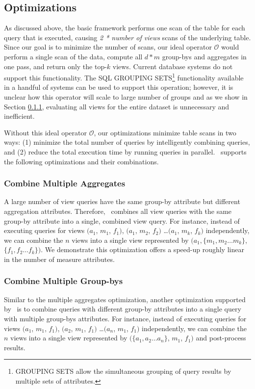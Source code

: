 \subsection{Optimizations} 
\label{sec:optimizations}
As discussed above, the basic framework performs one scan of the table for each
query that is executed, causing {\it 2 * number of views} scans of the
underlying table. Since our goal is to minimize the number of scans, our ideal
operator $\mathcal{O}$ would perform a single scan of the data, compute all
$d*m$ group-bys and aggregates in one pass, and return only the top-$k$
views.
Current database systems do not support this functionality. 
The SQL GROUPING SETS\footnote{GROUPING SETS allow the simultaneous
  grouping of query results by multiple sets of attributes.} functionality
  available in a handful of systems can be used to support this operation;
  however, it is unclear how this operator will scale to large number of groups
  and as we show in Section \ref{}, evaluating all views for the entire dataset
  is unnecessary and inefficient.

Without this ideal operator $\mathcal{O}$,
our optimizations minimize table scans in two ways: (1) minimize the total number of
queries by intelligently combining queries, and (2) reduce the total
execution time by running queries in parallel. \SeeDB\ supports the following
optimizations and their combinations.

\subsubsection {Combine Multiple Aggregates} 
A large number of view queries have the same group-by attribute but different
aggregation attributes. 
Therefore, \SeeDB\ combines all view queries with the same
group-by attribute into a single, combined view query. For instance, instead of executing
queries for views $(a_1$, $m_1$, $f_1)$, $(a_1$, $m_2$, $f_2)$ \ldots $(a_1$, $m_k$, $f_k)$
independently, we can combine the $n$ views into a single view represented by
$(a_1, \{m_1, m_2\ldots m_k\}$, $\{f_1, f_2\ldots f_k\})$. We demonstrate this
optimization offers a speed-up roughly linear in the number of measure
attributes.

\subsubsection {Combine Multiple Group-bys}
\label{subsec:mult_gb}
  Similar to the multiple aggregates optimization, another optimization
  supported by \SeeDB\ is to combine queries with different group-by attributes
  into a single query with multiple group-bys attributes.
  For instance, instead of executing queries for views $(a_1$, $m_1$, $f_1)$,
  $(a_2$, $m_1$, $f_1)$ \ldots $(a_n$, $m_1$, $f_1)$ independently, we can
  combine the $n$ views into a single view represented by $(\{a_1, a_2\ldots
  a_n\}$, $m_1$, $f_1)$ and post-process results.

